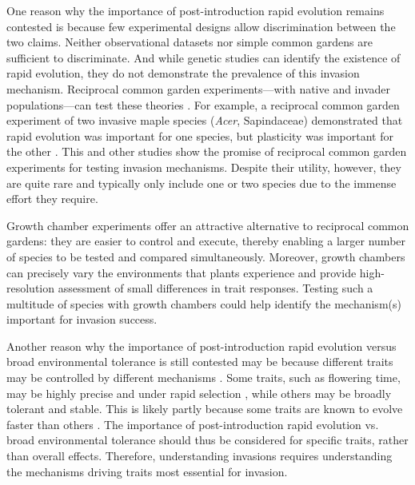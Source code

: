 \documentclass[12pt]{article}\usepackage[]{graphicx}\usepackage[]{color}
\begin{document}
	
	One reason why the importance of post-introduction rapid evolution remains contested is because few experimental designs allow discrimination between the two claims. Neither observational datasets \parencite[e.g.,][]{Wolkovich2013} nor simple common gardens \parencite[i.e., testing individuals from only one part of the range or in only one site,][]{Conner2004,Vitasse2009} are sufficient to discriminate. And while genetic studies can identify the existence of rapid evolution, they do not demonstrate the prevalence of this invasion mechanism. Reciprocal common garden experiments---with native and invader populations---can test these theories \parencite[e.g.,][]{Williams2008}. For example, a reciprocal common garden experiment of two invasive maple species (\textit{Acer}, Sapindaceae) demonstrated that rapid evolution was important for one species, but plasticity was important for the other \parencite{Lamarque2015}.  This and other studies show the promise of reciprocal common garden experiments for testing invasion mechanisms. Despite their utility, however, they are quite rare and typically only include one or two species due to the immense effort they require. 
	
	Growth chamber experiments offer an attractive alternative to reciprocal common gardens: they are easier to control and execute, thereby enabling a larger number of species to be tested and compared simultaneously. Moreover, growth chambers can precisely vary the environments that plants experience and provide high-resolution assessment of small differences in trait responses. Testing such a multitude of species with growth chambers could help identify the mechanism(s) important for invasion success.  
	
	Another reason why the importance of post-introduction rapid evolution versus broad environmental tolerance is still contested may be because different traits may be controlled by different mechanisms \parencite{Metz2020}. Some traits, such as flowering time, may be highly precise and under rapid selection \parencite{Weber1998}, while others may be broadly tolerant and stable. This is likely partly because some traits are known to evolve faster than others \parencite{Weiss-Lehman2017}. The importance of post-introduction rapid evolution vs. broad environmental tolerance should thus be considered for specific traits, rather than overall effects. Therefore,  understanding invasions requires understanding the mechanisms driving traits most essential for invasion.
	
\end{document}
